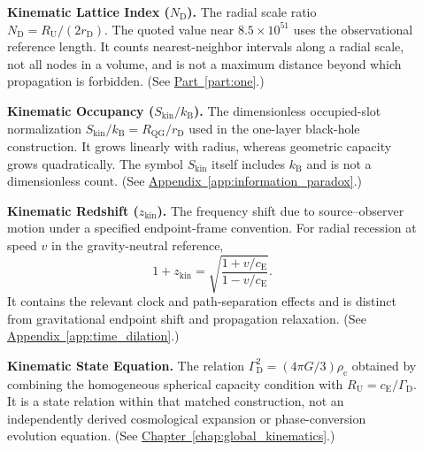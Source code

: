 \begin{description}
\item[] \begin{minipage}[t]{\linewidth}
\textbf{Kinematic Lattice Index ($N_{\mathrm D}$).} The radial scale ratio $N_{\mathrm D}=R_{\mathrm U}/(2r_{\mathrm D})$. The quoted value near $8.5\times10^{51}$ uses the observational reference length. It counts nearest-neighbor intervals along a radial scale, not all nodes in a volume, and is not a maximum distance beyond which propagation is forbidden.
(See \hyperref[part:one]{Part~\ref*{part:one}}.)
\end{minipage}

\item[] \begin{minipage}[t]{\linewidth}
\textbf{Kinematic Occupancy ($S_{\mathrm{kin}}/k_{\mathrm B}$).} The dimensionless occupied-slot normalization $S_{\mathrm{kin}}/k_{\mathrm B}=R_{\mathrm{QG}}/r_{\mathrm D}$ used in the one-layer black-hole construction. It grows linearly with radius, whereas geometric capacity grows quadratically. The symbol $S_{\mathrm{kin}}$ itself includes $k_{\mathrm B}$ and is not a dimensionless count.
(See \hyperref[app:information_paradox]{Appendix~\ref*{app:information_paradox}}.)
\end{minipage}

\item[] \begin{minipage}[t]{\linewidth}
\textbf{Kinematic Redshift ($z_{\mathrm{kin}}$).} The frequency shift due to source--observer motion under a specified endpoint-frame convention. For radial recession at speed $v$ in the gravity-neutral reference,
\[
 1+z_{\mathrm{kin}}
 =\sqrt{\frac{1+v/c_{\mathrm E}}{1-v/c_{\mathrm E}}}.
\]
It contains the relevant clock and path-separation effects and is distinct from gravitational endpoint shift and propagation relaxation.
(See \hyperref[app:time_dilation]{Appendix~\ref*{app:time_dilation}}.)
\end{minipage}

\item[] \begin{minipage}[t]{\linewidth}
\textbf{Kinematic State Equation.} The relation $\Gamma_{\mathrm D}^2=(4\pi G/3)\rho_{\mathrm c}$ obtained by combining the homogeneous spherical capacity condition with $R_{\mathrm U}=c_{\mathrm E}/\Gamma_{\mathrm D}$. It is a state relation within that matched construction, not an independently derived cosmological expansion or phase-conversion evolution equation.
(See \hyperref[chap:global_kinematics]{Chapter~\ref*{chap:global_kinematics}}.)
\end{minipage}


\end{description}
